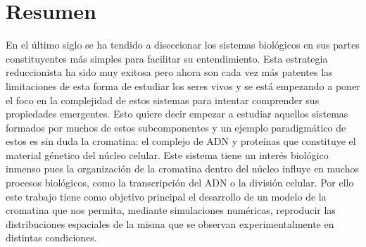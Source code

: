 \section*{Resumen}
\label{cap:abstract}

En el último siglo se ha tendido a diseccionar los sistemas biológicos en sus partes constituyentes más simples para facilitar su entendimiento. Esta estrategia reduccionista ha sido muy exitosa pero ahora son cada vez más patentes las limitaciones de esta forma de estudiar los seres vivos y se está empezando a poner el foco en la complejidad de estos sistemas para intentar comprender sus propiedades emergentes. Esto quiere decir empezar a estudiar aquellos sistemas formados por muchos de estos subcomponentes y un ejemplo paradigmático de estos es sin duda la cromatina: el complejo de ADN y proteínas que constituye el material génetico del núcleo celular. Este sistema tiene un interés biológico inmenso pues la organización de la cromatina dentro del núcleo influye en muchos procesos biológicos, como la transcripción del ADN o la división celular. Por ello este trabajo tiene como objetivo principal el desarrollo de un modelo de la cromatina que nos permita, mediante simulaciones numéricas, reproducir las distribuciones espaciales de la misma que se observan experimentalmente en distintas condiciones.
